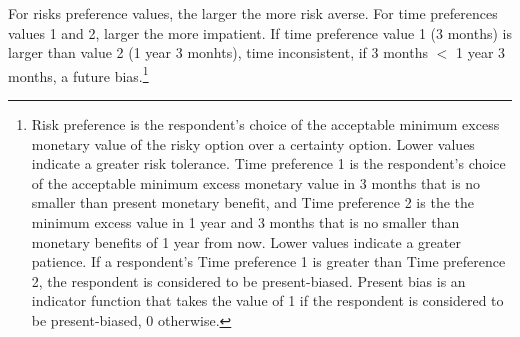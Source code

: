 For risks preference values, the larger the more risk averse. For time preferences values 1 and 2, larger the more impatient. If time preference value 1 (3 months) is larger than value 2 (1 year 3 monhts), time inconsistent, if 3 months $<$ 1 year 3 months, a future bias.\footnote{\textsf{Risk preference} is the respondent's choice of the acceptable minimum excess monetary value of the risky option over a certainty option. Lower values indicate a greater risk tolerance. \textsf{Time preference 1} is the respondent's choice of the acceptable minimum excess monetary value in 3 months that is no smaller than present monetary benefit, and \textsf{Time preference 2} is the the minimum excess value in 1 year and 3 months that is no smaller than monetary benefits of 1 year from now. Lower values indicate a greater patience. If a respondent's \textsf{Time preference 1} is greater than \textsf{Time preference 2}, the respondent is considered to be present-biased. \textsf{Present bias} is an indicator function that takes the value of 1 if the respondent is considered to be present-biased, 0 otherwise. }




